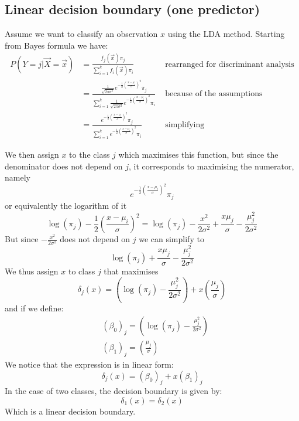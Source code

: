     \subsection{Linear decision boundary (one predictor)}
      Assume we want to classify an observation $x$ using the LDA method.
      Starting from Bayes formula we have:
        \begin{align*}
        P(Y=j|\vec{X}=\vec{x})  
          &= \frac{f_j(\vec{x})\pi_j}{\sum_{i = 1}^k f_i(\vec{x})\pi_i}
          & \text{ rearranged for discriminant analysis}\\
          &= \frac
          {\frac{1}{\sqrt{2\pi\sigma^2}} e^{-\frac{1}{2}\left(\frac{x-\mu_i}{\sigma}\right)^2}\pi_j}
          {\sum_{i = 1}^k\frac{1}{\sqrt{2\pi\sigma^2}} e^{-\frac{1}{2}\left(\frac{x-\mu_i}{\sigma}\right)^2}\pi_i}
          & \text{ because of the assumptions}\\
          &= \frac
          {e^{-\frac{1}{2}\left(\frac{x-\mu_i}{\sigma}\right)^2}\pi_j}
          {\sum_{i = 1}^k e^{-\frac{1}{2}\left(\frac{x-\mu_i}{\sigma}\right)^2}\pi_i}
          & \text{ simplifying}
        \end{align*}

      We then assign $x$ to the class $j$ which maximises this function, but since the denominator does not depend on $j$, it corresponds to maximising the numerator, namely
      $$e^{-\frac{1}{2}\left(\frac{x-\mu_i}{\sigma}\right)^2}\pi_j$$
      or equivalently the logarithm of it
      $$
      \log(\pi_j)-\frac{1}{2}\left(\frac{x-\mu_i}{\sigma}\right)^2 =
      \log(\pi_j)-\frac{x^2}{2\sigma^2} + \frac{x\mu_j}{\sigma}-\frac{\mu_j^2}{2\sigma^2}
      $$
      But since $-\frac{x^2}{2\sigma^2}$ does not depend on $j$ we can simplify to
      $$\log(\pi_j) + \frac{x\mu_j}{\sigma}-\frac{\mu_j^2}{2\sigma^2}$$
      We thus assign $x$ to class $j$ that maximises
      $$\delta_j(x) = \left(\log(\pi_j) -\frac{\mu_j^2}{2\sigma^2}\right) + x \left(\frac{\mu_j}{\sigma}\right)$$
      and if we define:
      \begin{align*}
      &(\beta_0)_j = \left(\log(\pi_j) -\frac{\mu_j^2}{2\sigma^2}\right) \\
      &(\beta_1)_j = \left(\frac{\mu_j}{\sigma}\right)
      \end{align*}
      We notice that the expression is in linear form:
      $$\delta_j(x) = (\beta_0)_j + x(\beta_1)_j$$
      In the case of two classes, the decision boundary is given by:
      $$\delta_1(x)=\delta_2(x)$$
      Which is a linear decision boundary.

